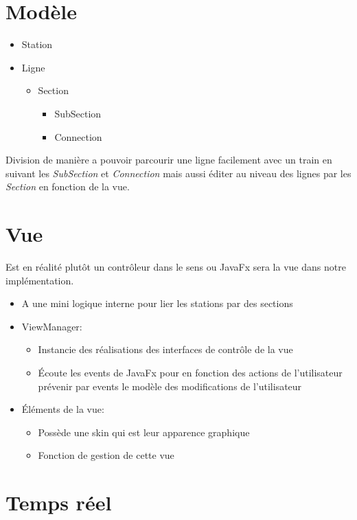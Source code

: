 \documentclass[report, backcover, french, nodocumentinfo]{upmethodology-document}
\begin{document}
		\section{Modèle}
			\begin{itemize}
				\item Station
				\item Ligne
					\begin{itemize}
						\item Section
							\begin{itemize}
								\item SubSection
								\item Connection
							\end{itemize}
					\end{itemize}
			\end{itemize}
			Division de manière a pouvoir parcourir une ligne facilement avec un train en suivant les \textit{SubSection} et \textit{Connection} mais aussi éditer au niveau des lignes par les \textit{Section} en fonction de la vue.
		\section{Vue}
			Est en réalité plutôt un contrôleur dans le sens ou JavaFx sera la vue dans notre implémentation.
			\begin{itemize}
				\item A une mini logique interne pour lier les stations par des sections
				\item ViewManager:
					\begin{itemize}
						\item Instancie des réalisations des interfaces de contrôle de la vue
						\item Écoute les events de JavaFx pour en fonction des actions de l'utilisateur prévenir par events le modèle des modifications de l'utilisateur
					\end{itemize}
				\item Éléments de la vue:
					\begin{itemize}
						\item Possède une skin qui est leur apparence graphique
						\item Fonction de gestion de cette vue
					\end{itemize}
			\end{itemize}
		\section{Temps réel}
\end{document}
